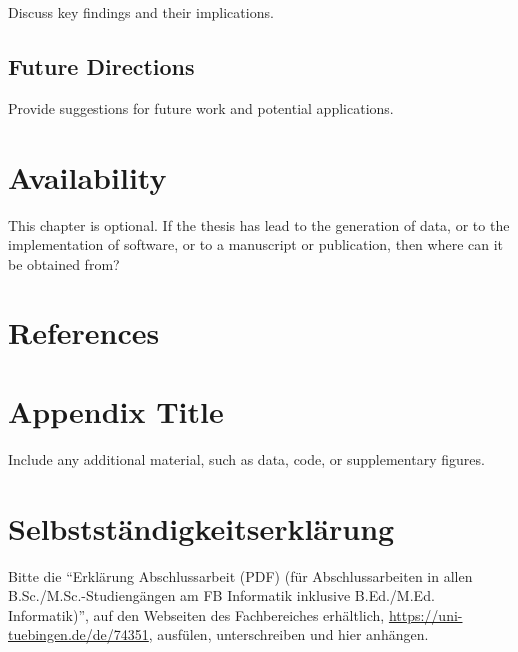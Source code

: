 \documentclass[12pt,a4paper]{report}
\begin{document}
        Discuss key findings and their implications.

        \section*{Future Directions}

        Provide suggestions for future work and potential applications.

        \chapter{Availability}

        This chapter is optional. If the thesis has lead to the generation of data, or to the implementation of software, or to a manuscript
        or publication, then where can it be obtained from?

        \chapter*{References}
        
        

        \appendix
        \chapter{Appendix Title}
        Include any additional material, such as data, code, or supplementary figures.

        \chapter*{Selbstst\"andigkeitserkl\"arung}

        Bitte  die ``Erkl\"arung Abschlussarbeit (PDF) (f\"ur Abschlussarbeiten in allen B.Sc./M.Sc.-Studieng\"angen am FB Informatik inklusive B.Ed./M.Ed. Informatik)'',
        auf den Webseiten des Fachbereiches erh\"altlich, \url{https://uni-tuebingen.de/de/74351},
        ausf\"ulen, unterschreiben und hier anh\"angen.

        
\end{document}
